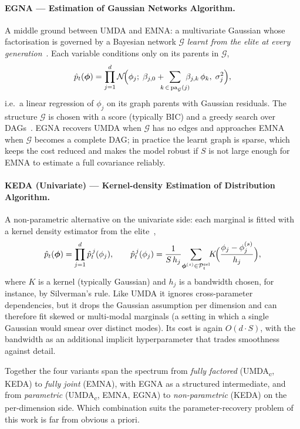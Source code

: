 \paragraph*{EGNA --- Estimation of Gaussian Networks Algorithm.}
A middle ground between UMDA and EMNA: a multivariate Gaussian whose
factorisation is governed by a Bayesian network $\mathcal{G}$
\emph{learnt from the elite at every
generation}~\cite{larranaga2002eda}. Each variable conditions only
on its parents in $\mathcal{G}$,
\[
    \hat{p}_t(\boldsymbol{\phi}) = \prod_{j=1}^{d}
    \mathcal{N}\!\Bigl(\phi_j;\;
    \beta_{j,0} + \!\!\!\!\sum_{k\,\in\,\mathrm{pa}_{\mathcal{G}}(j)}\!\!\!\!
    \beta_{j,k}\,\phi_k,\;
    \sigma_j^{2}\Bigr),
\]
i.e.\ a linear regression of $\phi_j$ on its graph parents with
Gaussian residuals. The structure $\mathcal{G}$ is chosen with a
score (typically BIC) and a greedy search over
DAGs~\cite{larranaga2002eda}. EGNA recovers UMDA when $\mathcal{G}$
has no edges and approaches EMNA when $\mathcal{G}$ becomes a
complete DAG; in practice the learnt graph is sparse, which keeps
the cost reduced and makes the model robust if 
$S$ is not large enough for EMNA to estimate a full covariance
reliably.

\paragraph*{KEDA (Univariate) --- Kernel-density Estimation of
Distribution Algorithm.} A non-parametric alternative on the
univariate side: each marginal is fitted with a kernel density
estimator from the elite~\cite{soloviev2024edaspy},
\[
    \hat{p}_t(\boldsymbol{\phi}) = \prod_{j=1}^{d}
    \hat{p}_t^{\,j}(\phi_j),
    \qquad
    \hat{p}_t^{\,j}(\phi_j)
    = \frac{1}{S\,h_j}\!\sum_{\boldsymbol{\phi}^{(s)}\in\mathcal{P}_t^{\text{sel}}}\!\!
    K\!\Bigl(\frac{\phi_j - \phi_j^{(s)}}{h_j}\Bigr),
\]
where $K$ is a kernel (typically Gaussian) and $h_j$ is a bandwidth
chosen, for instance, by Silverman's rule. Like UMDA it ignores
cross-parameter dependencies, but it drops the Gaussian assumption
per dimension and can therefore fit skewed or multi-modal marginals
(a setting in which a single Gaussian would smear over distinct
modes). Its cost is again $O(d\cdot S)$, with the bandwidth as an
additional implicit hyperparameter that trades smoothness against
detail.

\medskip

Together the four variants span the spectrum from \emph{fully
factored} (UMDA\textsubscript{c}, KEDA) to \emph{fully joint} (EMNA),
with EGNA as a structured intermediate, and from \emph{parametric}
(UMDA\textsubscript{c}, EMNA, EGNA) to \emph{non-parametric} (KEDA)
on the per-dimension side. Which combination suits the
parameter-recovery problem of this work is far from obvious a
priori.

